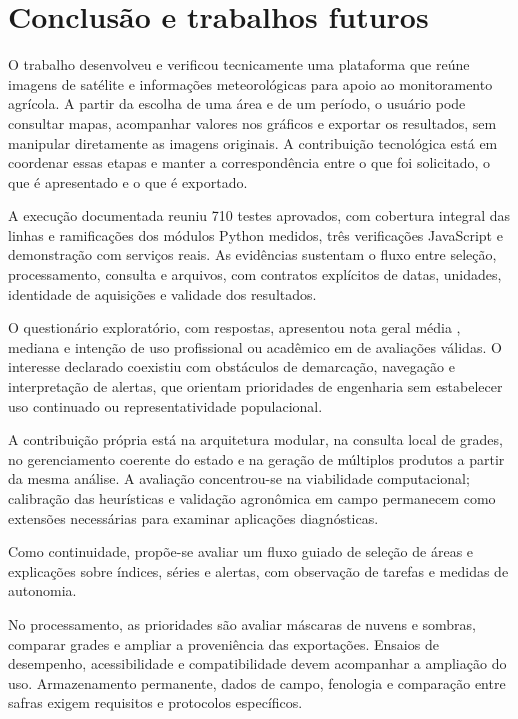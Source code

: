 \section{Conclusão e trabalhos futuros}\label{chap:conclusao-final}

O trabalho desenvolveu e verificou tecnicamente uma plataforma que reúne imagens de satélite e informações meteorológicas para apoio ao monitoramento agrícola. A partir da escolha de uma área e de um período, o usuário pode consultar mapas, acompanhar valores nos gráficos e exportar os resultados, sem manipular diretamente as imagens originais. A contribuição tecnológica está em coordenar essas etapas e manter a correspondência entre o que foi solicitado, o que é apresentado e o que é exportado.

A execução documentada reuniu 710 testes aprovados, com cobertura integral das linhas e ramificações dos módulos Python medidos, três verificações JavaScript e demonstração com serviços reais. As evidências sustentam o fluxo entre seleção, processamento, consulta e arquivos, com contratos explícitos de datas, unidades, identidade de aquisições e validade dos resultados.

O questionário exploratório, com \UsuariosN{} respostas, apresentou nota geral média \UsuariosMedia{}, mediana \UsuariosMediana{} e intenção de uso profissional ou acadêmico em \UsIntencaoPos{} de \UsIntencaoN{} avaliações válidas. O interesse declarado coexistiu com obstáculos de demarcação, navegação e interpretação de alertas, que orientam prioridades de engenharia sem estabelecer uso continuado ou representatividade populacional.

A contribuição própria está na arquitetura modular, na consulta local de grades, no gerenciamento coerente do estado e na geração de múltiplos produtos a partir da mesma análise. A avaliação concentrou-se na viabilidade computacional; calibração das heurísticas e validação agronômica em campo permanecem como extensões necessárias para examinar aplicações diagnósticas.

Como continuidade, propõe-se avaliar um fluxo guiado de seleção de áreas e explicações sobre índices, séries e alertas, com observação de tarefas e medidas de autonomia.

No processamento, as prioridades são avaliar máscaras de nuvens e sombras, comparar grades e ampliar a proveniência das exportações. Ensaios de desempenho, acessibilidade e compatibilidade devem acompanhar a ampliação do uso. Armazenamento permanente, dados de campo, fenologia e comparação entre safras exigem requisitos e protocolos específicos.
